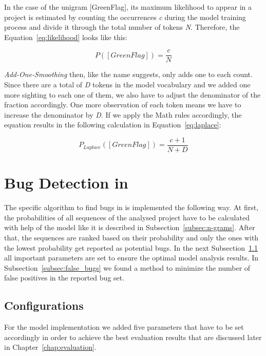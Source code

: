 In the case of the unigram [GreenFlag], its maximum likelihood to appear in a \scratch{} project is estimated by counting the occurrences \textit{c} during the model training process and divide it through the total number of tokens \textit{N}. Therefore, the Equation~\ref{eq:likelihood} looks like this:

\begin{equation} \label{eq:likelihood}
P([GreenFlag]) ={} \frac{c}{N}
\end{equation}

\textit{Add-One-Smoothing} then, like the name suggests, only adds one to each count. Since there are a total of \textit{D} tokens in the model vocabulary and we added one more sighting to each one of them, we also have to adjust the denominator of the fraction accordingly. One more observation of each token means we have to increase the denominator by \textit{D}. If we apply the Math rules accordingly, the equation results in the following calculation in Equation~\ref{eq:laplace}:

\begin{equation} \label{eq:laplace}
P_{Laplace}([GreenFlag]) ={} \frac{c + 1}{N + D}
\end{equation}


\section{Bug Detection in \scratch{}}\label{sec:detection}
The specific algorithm to find bugs in \scratch{} is implemented the following way. At first, the probabilities of all sequences of the analysed project have to be calculated with help of the model like it is described in Subsection~\ref{subsec:n-grams}. After that, the sequences are ranked based on their probability and only the ones with the lowest probability get reported as potential bugs. In the next Subsection~\ref{subsec:configurations} all important parameters are set to ensure the optimal model analysis results. In Subsection~\ref{subsec:false_bugs} we found a method to minimize the number of false positives in the reported bug set.

\subsection{Configurations}\label{subsec:configurations}
For the \scratch{} model implementation we added five parameters that have to be set accordingly in order to achieve the best evaluation results that are discussed later in Chapter~\ref{chap:evaluation}.

